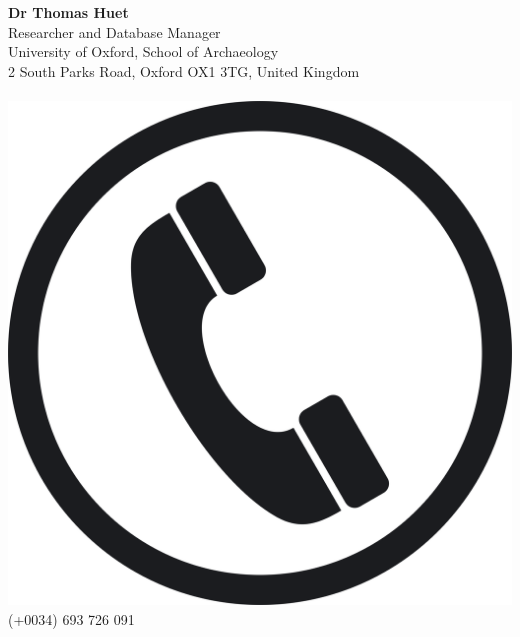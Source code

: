 \documentclass{article}
\begin{document}
\large{\textbf{Dr Thomas Huet}}\\
\normalsize
Researcher and Database Manager\\
University of Oxford, School of Archaeology\\
\small
2 South Parks Road, Oxford OX1 3TG, United Kingdom
\normalsize
\\
\\
\includegraphics[scale=0.005]{phone} \quad (+0034) 693 726 091 \\
\end{document}
